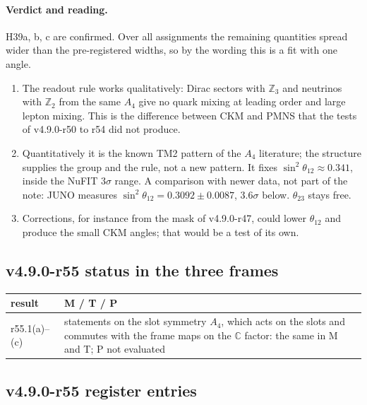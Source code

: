 \paragraph{Verdict and reading.}
H39a, b, c are confirmed.  Over all assignments the remaining quantities spread wider than the pre-registered widths, so by the wording this is a
fit with one angle.
\begin{enumerate}[leftmargin=2em]
\item The readout rule works qualitatively: Dirac sectors with \(\mathbb Z_3\) and neutrinos with \(\mathbb Z_2\) from the same \(A_4\) give no quark mixing
at leading order and large lepton mixing.  This is the difference between CKM and PMNS that the tests of v4.9.0-r50 to r54 did not produce.
\item Quantitatively it is the known TM2 pattern of the \(A_4\) literature; the structure supplies the group and the rule, not a new pattern.  It fixes
\(\sin^2\theta_{12}\approx0.341\), inside the NuFIT \(3\sigma\) range.  A comparison with newer data, not part of the note: JUNO measures
\(\sin^2\theta_{12}=0.3092\pm0.0087\), \(3.6\sigma\) below.  \(\theta_{23}\) stays free.
\item Corrections, for instance from the mask of v4.9.0-r47, could lower \(\theta_{12}\) and produce the small CKM angles; that would be a test of its own.
\end{enumerate}

\subsection*{v4.9.0-r55 status in the three frames}
\label{subsec:v490-r55-frames}

\begin{center}
\small
\begin{tabular}{@{}>{\raggedright\arraybackslash}p{}>{\raggedright\arraybackslash}p{}@{}}
\toprule
result & M / T / P\\
\midrule
r55.1(a)--(c) & statements on the slot symmetry \(A_4\), which acts on the slots and commutes with the frame maps on the \(\mathbb C\) factor: the same in M and T; P not evaluated\\
\bottomrule
\end{tabular}
\end{center}

\subsection*{v4.9.0-r55 register entries}
\label{subsec:v490-r55-register}

